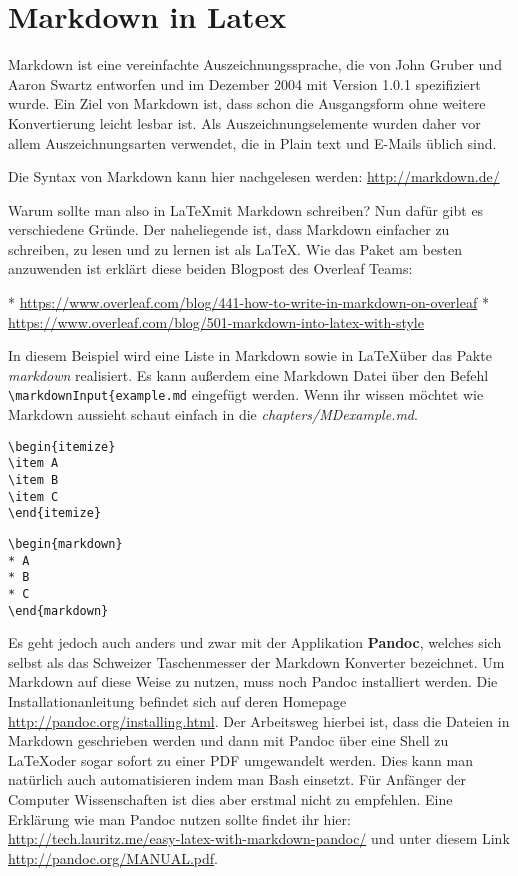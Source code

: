 \chapter{Markdown in Latex}
\label{MarkdowninLatex}
Markdown ist eine vereinfachte Auszeichnungssprache, die von John Gruber und Aaron Swartz entworfen und im Dezember 2004 mit Version 1.0.1 spezifiziert wurde. Ein Ziel von Markdown ist, dass schon die Ausgangsform ohne weitere Konvertierung leicht lesbar ist. Als Auszeichnungselemente wurden daher vor allem Auszeichnungsarten verwendet, die in Plain text und E-Mails üblich sind. \cite{WikiMarkdown,rfc7763}

Die Syntax von Markdown kann hier nachgelesen werden: \url{http://markdown.de/}

Warum sollte man also in \LaTeX mit Markdown schreiben? Nun dafür gibt es verschiedene Gründe. Der naheliegende ist, dass Markdown einfacher zu schreiben, zu lesen und zu lernen ist als \LaTeX.  Wie das Paket am besten anzuwenden ist erklärt diese beiden Blogpost des Overleaf Teams:

\begin{markdown}
 * \url{https://www.overleaf.com/blog/441-how-to-write-in-markdown-on-overleaf}
 * \url{https://www.overleaf.com/blog/501-markdown-into-latex-with-style} 
\end{markdown}

In diesem Beispiel wird eine Liste in Markdown sowie in \LaTeX über das Pakte \emph{markdown} realisiert. Es kann außerdem eine Markdown Datei über den Befehl \verb|\markdownInput{example.md| eingefügt werden. Wenn ihr wissen möchtet wie Markdown aussieht schaut einfach in die \emph{chapters/MDexample.md}.
\begin{lstlisting}[style=LaTeX]
\begin{itemize}
\item A
\item B
\item C
\end{itemize}
\end{lstlisting}

\begin{lstlisting}[style=LaTeX]
\begin{markdown}
* A
* B
* C
\end{markdown}
\end{lstlisting}


Es geht jedoch auch anders und zwar mit der Applikation \textbf{Pandoc}, welches sich selbst als das Schweizer Taschenmesser der Markdown Konverter bezeichnet. Um Markdown auf diese Weise zu nutzen, muss noch Pandoc installiert werden. Die Installationanleitung befindet sich auf deren Homepage \url{http://pandoc.org/installing.html}. Der Arbeitsweg hierbei ist, dass die Dateien in Markdown geschrieben werden und dann mit Pandoc über eine Shell zu \LaTeX oder sogar sofort zu einer PDF umgewandelt werden. Dies kann man natürlich auch automatisieren indem man Bash einsetzt. Für Anfänger der Computer Wissenschaften ist dies aber erstmal nicht zu empfehlen. Eine Erklärung wie man Pandoc nutzen sollte findet ihr hier: \url{http://tech.lauritz.me/easy-latex-with-markdown-pandoc/} und unter diesem Link \url{http://pandoc.org/MANUAL.pdf}.  

